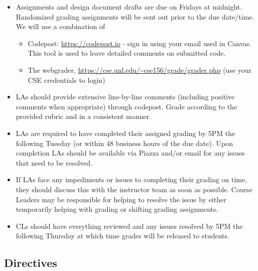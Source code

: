 \documentclass[12pt]{scrartcl}
\begin{document}
\begin{itemize}
  \item Assignments and design document drafts are due on Fridays at midnight.  
  Randomized grading assignments will be sent out prior to the due 
  date/time.  We will use a combination of 
  \begin{itemize}
    \item Codepost: \url{https://codepost.io} - sign in using your email used in Canvas.
    This tool is used to leave detailed comments on submitted code.
    \item The webgrader, \url{https://cse.unl.edu/~cse156/grade/grader.php} (use
    your CSE credentials to login)
  \end{itemize}
  
  \item LAs should provide extensive line-by-line comments (including
  positive comments when appropriate) through codepost.  Grade according
  to the provided rubric and in a consistent manner.  
    
  \item LAs are required to have completed their assigned grading by 
    5PM the following Tuesday (or within 48 business hours of the due 
    date).  Upon completion LAs should be available via Piazza and/or 
    email for any issues that need to be resolved.
  \item If LAs face any impediments or issues to completing
    their grading on time, they should discuss this with the instructor
    team as soon as possible.  Course Leaders may be 
    responsible for helping to resolve the issue by either 
    temporarily helping with grading or shifting grading assignments.  
  \item CLs should have everything reviewed and
    any issues resolved by 5PM the following Thursday at which time 
    grades will be released to students.

\end{itemize}

\subsection*{Directives}
\end{document}
